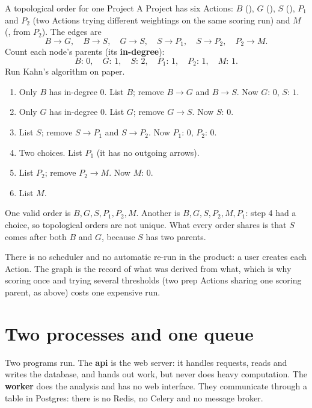 \begin{worked}[label={we:product:topo}]{A topological order for one Project}
A Project has six Actions: $B$ (), $G$ (),
$S$ (), $P_1$ and $P_2$ (two  Actions trying
different weightings on the same scoring run) and $M$ (, from
$P_2$). The edges are
\[ B \to G,\quad B \to S,\quad G \to S,\quad S \to P_1,\quad S \to P_2,\quad P_2 \to M. \]
Count each node's parents (its \textbf{in-degree}):
\[ B{:}\,0,\quad G{:}\,1,\quad S{:}\,2,\quad P_1{:}\,1,\quad P_2{:}\,1,\quad M{:}\,1. \]
Run Kahn's algorithm on paper.
\begin{enumerate}
\item Only $B$ has in-degree $0$. List $B$; remove $B \to G$ and $B \to S$. Now
$G{:}\,0$, $S{:}\,1$.
\item Only $G$ has in-degree $0$. List $G$; remove $G \to S$. Now $S{:}\,0$.
\item List $S$; remove $S \to P_1$ and $S \to P_2$. Now $P_1{:}\,0$, $P_2{:}\,0$.
\item Two choices. List $P_1$ (it has no outgoing arrows).
\item List $P_2$; remove $P_2 \to M$. Now $M{:}\,0$.
\item List $M$.
\end{enumerate}
One valid order is $B, G, S, P_1, P_2, M$. Another is $B, G, S, P_2, M, P_1$: step 4 had a
choice, so topological orders are not unique. What every order shares is that $S$ comes after
both $B$ and $G$, because $S$ has two parents.
\end{worked}

There is no scheduler and no automatic re-run in the product: a user creates each Action. The graph
is the record of what was derived from what, which is why scoring once and trying several
thresholds (two prep Actions sharing one scoring parent, as above) costs one expensive run.

\section{Two processes and one queue}\label{sec:product:queue}

Two programs run. The \textbf{api} is the web server: it handles requests, reads and writes the
database, and hands out work, but never does heavy computation. The \textbf{worker} does the
analysis and has no web interface. They communicate through a  table in Postgres:
there is no Redis, no Celery and no message broker.


